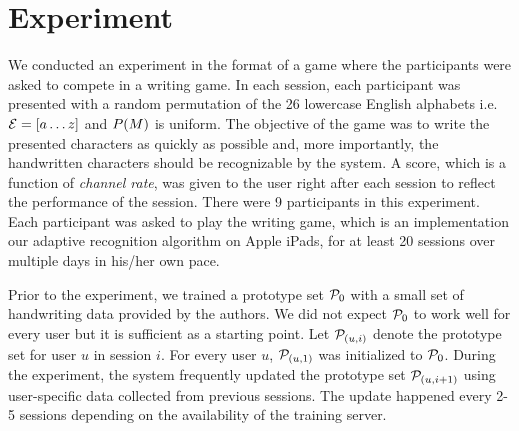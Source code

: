 \documentclass{sigchi}
\begin{document}
\section{Experiment}
\label{sec:experiment}


We conducted an experiment in the format of a game where the
participants were asked to compete in a writing game. In each session,
each participant was presented with a random permutation of the 26
lowercase English alphabets i.e. $\mathcal{E} = \left[ a \ldots z \right]$
and $P(M)$ is uniform. The objective of the game was to write
the presented characters as quickly as possible and, more importantly,
the handwritten characters should be recognizable by the system. A
score, which is a function of {\it channel rate}, was given to the
user right after each session to reflect the performance of the
session. There were 9 participants in this experiment. Each participant was
asked to play the writing game, which is an implementation our adaptive
recognition algorithm on Apple iPads, for at least
20 sessions over multiple days in his/her own pace. 

Prior to the experiment, we trained a prototype set $\mathcal{P}_0$
with a small set of handwriting data provided by the authors. We did
not expect $\mathcal{P}_0$ to work well for every user but it is
sufficient as a starting point. Let $\mathcal{P}_{(u,i)}$ denote the
prototype set for user $u$ in session $i$. For every user $u$,
$\mathcal{P}_{(u,1)}$ was initialized to $\mathcal{P}_0$. During
the experiment, the system frequently updated the prototype set
$\mathcal{P}_{(u,i+1)}$ using user-specific data collected from
previous sessions. The update happened every 2-5 sessions
depending on the availability of the training server. 

\end{document}
